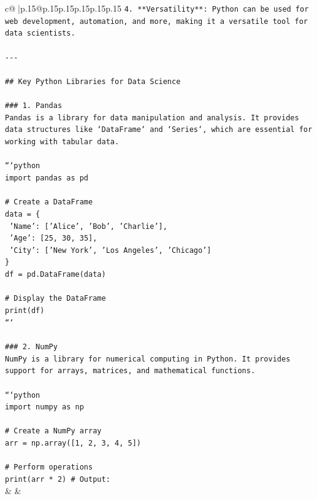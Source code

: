 \documentclass{article}
\begin{document}
{\begin{supertabular}{c@{$\;$}|p{.15\linewidth}@{}p{.15\linewidth}p{.15\linewidth}p{.15\linewidth}p{.15\linewidth}p{.15\linewidth}}
{{{\texttt{4. **Versatility**: Python can be used for web development, automation, and more, making it a versatile tool for data scientists.} \\
\\ 
\texttt{{-}{-}{-}} \\
\\ 
\texttt{\#\# Key Python Libraries for Data Science} \\
\\ 
\texttt{\#\#\# 1. Pandas} \\
\texttt{Pandas is a library for data manipulation and analysis. It provides data structures like `DataFrame` and `Series`, which are essential for working with tabular data.} \\
\\ 
\texttt{```python} \\
\texttt{import pandas as pd} \\
\\ 
\texttt{\# Create a DataFrame} \\
\texttt{data = \{} \\
\texttt{    'Name': {[}'Alice', 'Bob', 'Charlie'{]},} \\
\texttt{    'Age': {[}25, 30, 35{]},} \\
\texttt{    'City': {[}'New York', 'Los Angeles', 'Chicago'{]}} \\
\texttt{\}} \\
\texttt{df = pd.DataFrame(data)} \\
\\ 
\texttt{\# Display the DataFrame} \\
\texttt{print(df)} \\
\texttt{```} \\
\\ 
\texttt{\#\#\# 2. NumPy} \\
\texttt{NumPy is a library for numerical computing in Python. It provides support for arrays, matrices, and mathematical functions.} \\
\\ 
\texttt{```python} \\
\texttt{import numpy as np} \\
\\ 
\texttt{\# Create a NumPy array} \\
\texttt{arr = np.array({[}1, 2, 3, 4, 5{]})} \\
\\ 
\texttt{\# Perform operations} \\
\texttt{print(arr * 2)  \# Output:} \\
            }
        }
    }
    & & \\ \\


\end{supertabular}}
\end{document}
